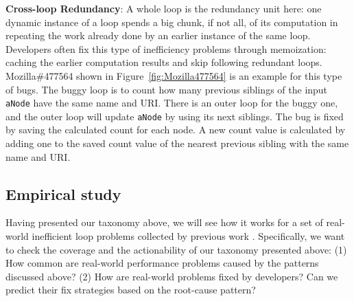 {\textbf{Cross-loop Redundancy}}:
A whole loop is the redundancy unit here:
one dynamic instance of a loop spends a big chunk, if not all, of its
computation in repeating the work already done by an
earlier instance of the same loop.
Developers often fix this type of inefficiency problems through memoization:
caching the earlier computation results and skip following redundant loops.
Mozilla\#477564 shown in Figure~\ref{fig:Mozilla477564} is an example for this type of bugs. 
The buggy loop is to count how many previous siblings of the input \texttt{aNode} have the same name and URI. 
There is an outer loop for the buggy one, and the outer loop will update \texttt{aNode} by using its next siblings. 
The bug is fixed by saving the calculated count for each node. 
A new count value is calculated by adding one to the saved count value of the nearest previous sibling with the same name and URI.


\subsection{Empirical study}
\label{sec:tax_study}
Having presented our taxonomy above, we will see how it works for a set of
real-world inefficient loop problems collected by previous work
\cite{SongOOPSLA2014,PerfBug}. Specifically, we want to check the 
coverage and the actionability of our taxonomy presented above:
(1) How common are real-world performance problems caused by the 
patterns discussed above?
(2) How are real-world problems fixed by developers? Can we predict their
fix strategies based on the root-cause pattern?

